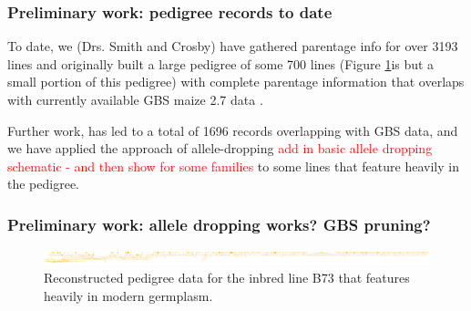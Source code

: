\documentclass[draft,12pt]{article}
\begin{document}
\subsubsection*{Preliminary work: pedigree records to date}
To date, we (Drs. Smith and Crosby) have gathered parentage info for over 3193 lines and originally built a large pedigree of some 700 lines (Figure \ref{fig:b73isbig}is but a small portion of this pedigree) with complete parentage information that overlaps with currently available GBS maize 2.7 data \citep{Glaubitz:2014eu}. 
\par Further work, has led to a total of 1696 records overlapping with GBS data, and we have applied the approach of allele-dropping \textcolor{red}{add in basic allele dropping schematic - and then show for some families} to some lines that feature heavily in the pedigree.

\subsubsection*{Preliminary work: allele dropping works? GBS pruning?}


\begin{figure}[ht]
\includegraphics[width=1.0\linewidth]{pedigree_poster.pdf}
\caption{Reconstructed pedigree data for the inbred line B73 that features heavily in modern germplasm.}
\label{fig:b73isbig}
\end{figure}
\end{document}
